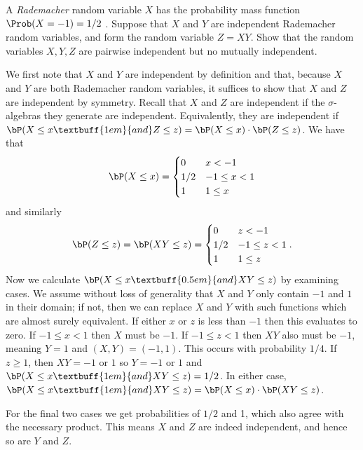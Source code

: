 \begin{homework}[e]
  \prob A \emph{Rademacher} random variable $X$ has the probability mass function $\Prob(X = -1) = 1/2$ . Suppose that $X$ and $Y$ are independent Rademacher random variables, and form the random variable $Z = XY$. Show that the random variables $X,Y,Z$ are pairwise independent but no mutually independent.
  \begin{prf}
    We first note that $X$ and $Y$ are independent by definition and that, because $X$ and $Y$ are both Rademacher random variables, it suffices to show that $X$ and $Z$ are independent by symmetry. 
    Recall that $X$ and $Z$ are independent if the $\sigma$-algebras they generate are independent. Equivalently, they are independent if $\bP(X\leq x\textbuff{1em}{and} Z \leq z) = \bP(X\leq x)\cdot \bP(Z\leq z)$. We have that
    \begin{align*}
      \bP(X\leq x) =
      \begin{cases}
        0 & x < -1 \\
        1/2 & -1 \leq x < 1 \\
        1 & 1 \leq x
      \end{cases}
    \end{align*}
    and similarly
    \begin{align*}
      \bP(Z \leq z) = \bP(XY \leq z) =
      \begin{cases}
        0 & z < -1 \\
        1/2 & -1 \leq z < 1 \\
        1 & 1 \leq z
      \end{cases}.
    \end{align*}
    Now we calculate $\bP(X\leq x\textbuff{0.5em}{and} XY\leq z)$ by examining cases. We assume without loss of generality that $X$ and $Y$ only contain $-1$ and $1$ in their domain; if not, then we can replace $X$ and $Y$ with such functions which are almost surely equivalent. If either $x$ or $z$ is less than $-1$ then this evaluates to zero. If $-1 \leq x< 1$ then $X$ must be $-1$. If $-1 \leq z < 1$ then $XY$ also must be $-1$, meaning $Y = 1$ and $(X,Y) = (-1, 1)$. This occurs with probability $1/4$. If $z \geq 1$, then $XY = -1$ or $1$ so $Y = -1$ or $1$ and $\bP(X\leq x\textbuff{1em}{and} XY\leq z) = 1/2$. In either case, $\bP(X\leq x\textbuff{1em}{and} XY\leq z) = \bP(X \leq x)\cdot \bP(XY \leq z)$.

    For the final two cases we get probabilities of $1/2$ and 1, which also agree with the necessary product. This means $X$ and $Z$ are indeed independent, and hence so are $Y$ and $Z$.


\end{prf}
\end{homework}

